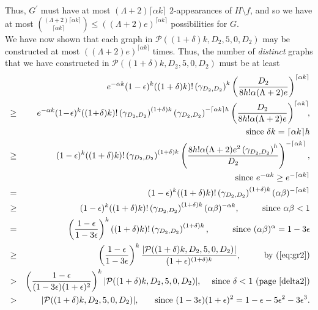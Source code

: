 \documentclass{article}
\newtheorem{Proof of Theorem}{Proof of Theorem}
\begin{document}
Thus, $G^{\prime}$ must have at most $(\Lambda + 2) \lceil \alpha k \rceil$
$2$-appearances of $H \setminus f$,
and so we have at most 
$\left( ^{(\Lambda + 2) \lceil \alpha k \rceil}_{\phantom{ww} \lceil \alpha k \rceil} \right)
\leq ((\Lambda + 2)e)^{\lceil \alpha k \rceil}$
possibilities for $G$. \\

We have now shown that each graph in $\mathcal{P}((1+\delta)k,D_{2},5,0,D_{2})$
may be constructed at most $((\Lambda + 2)e)^{\lceil \alpha k \rceil}$ times.
Thus, the number of \textit{distinct} graphs that we have constructed in $\mathcal{P}((1+\delta)k,D_{2},5,0,D_{2})$
must be at least \\
\begin{eqnarray*}
& & e^{-\alpha k} (1-\epsilon)^{k} ((1+\delta)k)! \left( \gamma_{D_{2},D_{2}} \right)^{k}
\left( \frac{D_{2}}{8h! \alpha (\Lambda +2)e} \right)^{\lceil \alpha k \rceil} \\
& \geq & e^{-\alpha k} (1\!-\!\epsilon)^{k} ((1\!+\!\delta)k)! \left( \gamma_{D_{2},D_{2}} \right)^{(1+\delta)k}
\left( \gamma_{D_{2},D_{2}} \right)^{- \lceil \alpha k \rceil h}
\left( \frac{D_{2}}{8h! \alpha (\Lambda +2)e} \right)^{\lceil \alpha k \rceil}\!\!, \\
& & \textrm{ since } \delta k = \lceil \alpha k \rceil h \\
& \geq & (1-\epsilon)^{k} ((1+\delta)k)! \left( \gamma_{D_{2},D_{2}} \right)^{(1+\delta)k}
\left( \frac{8h! \alpha (\Lambda +2) 
e^{2} \left( \gamma_{D_{2},D_{2}} \right)^{h}}{D_{2}} \right)^{- \lceil \alpha k \rceil}, \\
& & \textrm{ since } e^{- \alpha k} \geq e^{- \lceil \alpha k \rceil} \\
& = & (1-\epsilon)^{k} ((1+\delta)k)! \left( \gamma_{D_{2},D_{2}} \right)^{(1+\delta)k}
(\alpha \beta)^{- \lceil \alpha k \rceil} \\
& \geq & (1-\epsilon)^{k} ((1+\delta)k)! \left( \gamma_{D_{2},D_{2}} \right)^{(1+\delta)k}
(\alpha \beta)^{- \alpha k} 
\textrm{, \phantom{www} since } \alpha \beta < 1 \\
& = & \left( \frac{1-\epsilon}{1-3\epsilon} \right)^{k} ((1+\delta)k)! \left( \gamma_{D_{2},D_{2}} \right)^{(1+\delta)k} 
\textrm{, \phantom{www} since } (\alpha \beta)^{\alpha} = 1-3 \epsilon \\
& \geq & \left( \frac{1-\epsilon}{1-3\epsilon} \right)^{k} 
\frac{|\mathcal{P}((1+\delta)k,D_{2},5,0,D_{2})|}{(1+\epsilon)^{(1+\delta)k}} 
\textrm{, \phantom{www} by (\ref{eq:gr2})} \\
& > & \left( \frac{1-\epsilon}{(1-3\epsilon)(1+\epsilon)^{2}} \right)^{k} 
|\mathcal{P}((1+\delta)k,D_{2},5,0,D_{2})| 
\textrm{, \phantom{w} since } \delta < 1 \textrm{ (page~\pageref{delta2}}) \\
& > & |\mathcal{P}((1+\delta)k,D_{2},5,0,D_{2})|,
\phantom{ww} \textrm{ since }(1-3\epsilon)(1+\epsilon)^{2} = 1 - \epsilon - 5 \epsilon^{2} - 3 \epsilon^{3}.
\end{eqnarray*}
\end{document}
